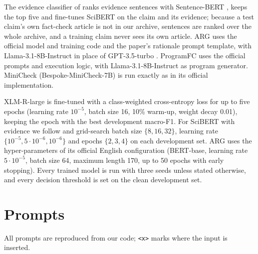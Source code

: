 \documentclass[11pt]{article}
\begin{document}
The evidence classifier of \citet{kotonya2020pubhealth} ranks evidence sentences with Sentence-BERT \citep{reimers2019sbert}, keeps the top five and fine-tunes SciBERT \citep{beltagy2019scibert} on the claim and its evidence; because a test claim's own fact-check article is not in our archive, sentences are ranked over the whole archive, and a training claim never sees its own article. ARG uses the official model and training code and the paper's rationale prompt template, with Llama-3.1-8B-Instruct in place of GPT-3.5-turbo \citep{openai2022chatgpt}. ProgramFC uses the official prompts and execution logic, with Llama-3.1-8B-Instruct as program generator. MiniCheck (Bespoke-MiniCheck-7B) is run exactly as in its official implementation.

XLM-R-large is fine-tuned with a class-weighted cross-entropy loss for up to five epochs (learning rate $10^{-5}$, batch size 16, 10\% warm-up, weight decay 0.01), keeping the epoch with the best development macro-F1. For SciBERT with evidence we follow \citet{kotonya2020pubhealth} and grid-search batch size $\{8,16,32\}$, learning rate $\{10^{-5}, 5\cdot10^{-6}, 10^{-6}\}$ and epochs $\{2,3,4\}$ on each development set. ARG uses the hyper-parameters of its official English configuration (BERT-base, learning rate $5\cdot10^{-5}$, batch size 64, maximum length 170, up to 50 epochs with early stopping). Every trained model is run with three seeds unless stated otherwise, and every decision threshold is set on the clean development set.

\section{Prompts}
\label{sec:appendix_prompts}

All prompts are reproduced from our code; \texttt{\textless{}x\textgreater{}} marks where the input is inserted.


\end{document}
